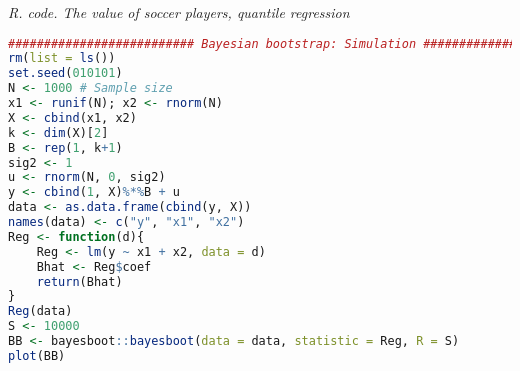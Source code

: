 \begin{enumerate}[leftmargin=*]
\begin{tcolorbox}[enhanced,width=4.67in,center upper,
	fontupper=\large\bfseries,drop shadow southwest,sharp corners]
	\textit{R. code. The value of soccer players, quantile regression}
	\begin{VF}
		\begin{lstlisting}[language=R]
########################## Bayesian bootstrap: Simulation ##########################
rm(list = ls())
set.seed(010101)
N <- 1000 # Sample size
x1 <- runif(N); x2 <- rnorm(N)
X <- cbind(x1, x2)
k <- dim(X)[2]
B <- rep(1, k+1)
sig2 <- 1
u <- rnorm(N, 0, sig2)
y <- cbind(1, X)%*%B + u
data <- as.data.frame(cbind(y, X))
names(data) <- c("y", "x1", "x2")
Reg <- function(d){
	Reg <- lm(y ~ x1 + x2, data = d)
	Bhat <- Reg$coef
	return(Bhat)
}
Reg(data)
S <- 10000
BB <- bayesboot::bayesboot(data = data, statistic = Reg, R = S)
plot(BB)
\end{lstlisting}
	\end{VF}
\end{tcolorbox}	

\end{enumerate}